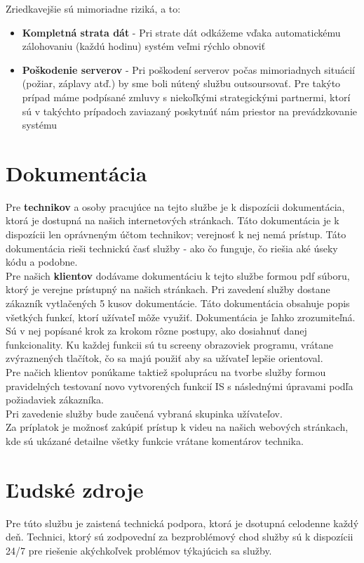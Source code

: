 \documentclass[a4paper, 11pt]{article}
\begin{document}
Zriedkavejšie sú mimoriadne riziká, a to:
\begin{itemize}
\item \textbf{Kompletná strata dát} - Pri strate dát odkážeme vďaka automatickému zálohovaniu (každú hodinu) systém veľmi rýchlo obnoviť
\item \textbf{Poškodenie serverov} - Pri poškodení serverov počas mimoriadnych situácií (požiar, záplavy atď.) by sme boli nútený službu outsoursovať. Pre takýto prípad máme podpísané zmluvy s niekoľkými strategickými partnermi, ktorí sú v takýchto prípadoch zaviazaný poskytnúť nám priestor na prevádzkovanie systému
\end{itemize}

\section{Dokumentácia}
Pre \textbf{technikov} a osoby pracujúce na tejto službe je k dispozícii dokumentácia, ktorá je dostupná na našich internetových stránkach. Táto dokumentácia je k dispozícii len oprávneným účtom technikov; verejnosť k nej nemá prístup. Táto dokumentácia rieši technickú časť služby - ako čo funguje, čo riešia aké úseky kódu a podobne. 
\\

Pre našich \textbf{klientov} dodávame dokumentáciu k tejto službe formou pdf súboru, ktorý je verejne prístupný na našich stránkach. Pri zavedení služby dostane zákazník vytlačených 5 kusov dokumentácie. Táto dokumentácia obsahuje popis všetkých funkcí, ktorí užívateľ môže využiť. Dokumentácia je ľahko zrozumiteľná. Sú v nej popísané krok za krokom rôzne postupy, ako dosiahnuť danej funkcionality. Ku každej funkcii sú tu screeny obrazoviek programu, vrátane zvýraznených tlačítok, čo sa majú použiť aby sa užívateľ lepšie orientoval.
\\

Pre načich klientov ponúkame taktiež spoluprácu na tvorbe služby formou pravidelných testovaní novo vytvorených funkcií IS s následnými úpravami podľa požiadaviek zákazníka.
\\

Pri zavedenie služby bude zaučená vybraná skupinka užívateľov.
\\

Za príplatok je možnosť zakúpiť prístup k videu na našich webových stránkach, kde sú ukázané detailne všetky funkcie vrátane komentárov technika.

\section{Ľudské zdroje}
Pre túto službu je zaistená technická podpora, ktorá je dsotupná celodenne každý deň. Technici, ktorý sú zodpovední za bezproblémový chod služby sú k dispozícii 24/7 pre riešenie akýchkoľvek problémov týkajúcich sa služby.
\end{document}
